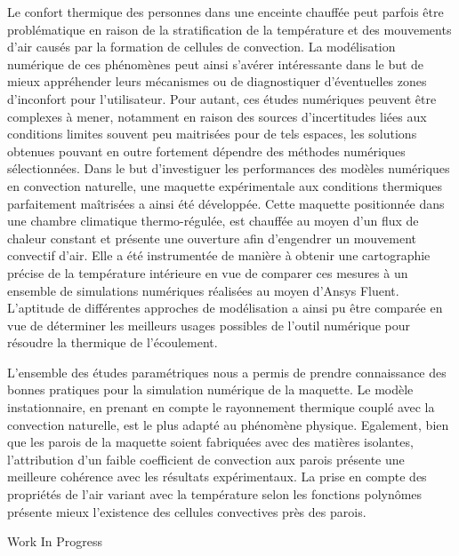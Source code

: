 {\normalsize
Le confort thermique des personnes dans une enceinte chauffée peut parfois être problématique en raison de la stratification de la température et des mouvements d'air causés par la formation de cellules de convection. La modélisation numérique de ces phénomènes peut ainsi s'avérer intéressante dans le but de mieux appréhender leurs mécanismes ou de diagnostiquer d'éventuelles zones d'inconfort pour l'utilisateur. Pour autant, ces études numériques peuvent être complexes à mener, notamment en raison des sources d'incertitudes liées aux conditions limites souvent peu maitrisées pour de tels espaces, les solutions obtenues pouvant en outre fortement dépendre des méthodes numériques sélectionnées. Dans le but d'investiguer les performances des modèles numériques en convection naturelle, une maquette expérimentale aux conditions thermiques parfaitement maîtrisées a ainsi été développée. Cette maquette positionnée dans une chambre climatique thermo-régulée, est chauffée au moyen d'un flux de chaleur constant et présente une ouverture afin d'engendrer un mouvement convectif d'air. Elle a été instrumentée de manière à obtenir une cartographie précise de la température intérieure en vue de comparer ces mesures à un ensemble de simulations numériques réalisées au moyen d'Ansys Fluent. L'aptitude de différentes approches de modélisation a ainsi pu être comparée en vue de déterminer les meilleurs usages possibles de l'outil numérique pour résoudre la thermique de l'écoulement. 



L'ensemble des études paramétriques nous a permis de prendre connaissance des bonnes pratiques pour la simulation numérique de la maquette. Le modèle instationnaire, en prenant en compte le rayonnement thermique couplé avec la convection naturelle, est le plus adapté au phénomène physique. Egalement, bien que les parois de la maquette soient fabriquées avec des matières isolantes, l'attribution d'un faible coefficient de convection aux parois présente une meilleure cohérence avec les résultats expérimentaux. La prise en compte des propriétés de l'air variant avec la température selon les fonctions polynômes présente mieux l'existence des cellules convectives près des parois.

 \vfill Work In Progress

}
 
